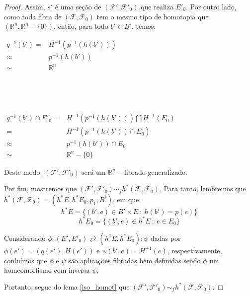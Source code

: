 \documentclass[12pt,oneside]{book} %
\newcommand{\R}{\mathbb{R}}
\begin{document}
\begin{proof}
	\par Assim, $s'$ é uma seção de $(\mathcal{F'},\mathcal{F'}_{0})$ que realiza $E'_{0}$. Por outro lado, como toda fibra de $(\mathcal{F},\mathcal{F}_{0})$ tem o mesmo tipo de homotopia que $(\R^{n},\R^{n}-\{ 0 \})$, então, para todo $b'\in B'$, temos: \newline
	
	$\begin{array}{rl}
		q^{-1}(b')=       & H^{-1}(p^{-1}(h(b'))) \\
		\approx & p^{-1}(h(b')) \\
		\sim    & \R^{n}
	\end{array}$
	
	\
	
	\
	
	$\begin{array}{rl}
		q^{-1}(b')\cap E'_{0}=       & H^{-1}(p^{-1}(h(b')))\bigcap H^{-1}(E_{0}) \\
		=       & H^{-1}(p^{-1}(h(b'))\cap E_{0}) \\
		\approx & p^{-1}(h(b'))\cap E_{0} \\
		\sim    & \R^{n}-\{ 0 \}
	\end{array}$ \newline 
	
	\par Deste modo, $(\mathcal{F'},\mathcal{F'}_{0})$ será um $\R^{n}-$fibrado generalizado.
	
	\par Por fim, mostremos que $(\mathcal{F'},\mathcal{F'}_{0})\sim_{f} h^{*}(\mathcal{F},\mathcal{F}_{0})$. Para tanto, lembremos que $h^{*}(\mathcal{F},\mathcal{F}_{0})=(h^{*}E,h^{*}E_{0},p_{1},B')$, em que:
	$$ h^{*}E=\{ (b',e)\in B'\times E \ : \ h(b')=p(e) \} $$
	$$ h^{*}E_{0}=\{ (b',e)\in h^{*}E \ : \ e\in E_{0} \} $$
	
	\par Considerando $\phi:(E',E'_{0})\rightleftarrows (h^{*}E,h^{*}E_{0}):\psi$ dadas por $\phi(e')=(q(e'),H(e'))$ e $\psi(b',e)=H^{-1}(e)$, respectivamente, conluímos que $\phi$ e $\psi$ são aplicações fibradas bem definidas sendo $\phi$ um homeomorfismo com inversa $\psi$.
	
	\par Portanto, segue do lema \ref{iso_homot} que $(\mathcal{F'},\mathcal{F'}_{0})\sim_{f} h^{*}(\mathcal{F},\mathcal{F}_{0})$.
	
\end{proof}
\end{document}
